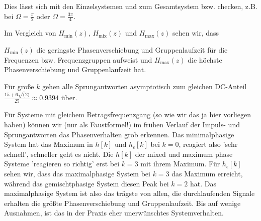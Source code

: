 \begin{Loesung}
Dies lässt sich mit den Einzelsystemen  und
 zum Gesamtsystem 
bzw.  checken, z.B. bei $\Omega=\frac{\pi}{2}$ oder
$\Omega=\frac{3\pi}{4}$.

Im Vergleich von $H_\mathrm{min}(z)$, $H_\mathrm{mix}(z)$ und $H_\mathrm{max}(z)$
sehen wir, dass

$H_\mathrm{min}(z)$ die geringste Phasenverschiebung und Gruppenlaufzeit
für die Frequenzen bzw. Frequenzgruppen aufweist und $H_\mathrm{max}(z)$
die höchste Phasenverschiebung und Gruppenlaufzeit hat.

Für große $k$ gehen alle Sprungantworten asymptotisch zum gleichen DC-Anteil
$\frac{15+6\sqrt(2)}{25} \approx 0.9394$ über.

Für Systeme mit gleichem Betragsfrequenzgang (so wie wir das ja hier vorliegen
haben) können wir (nur als Faustformel!) im frühen Verlauf der Impuls- und
Sprungantworten das Phasenverhalten grob erkennen.
Das minimalphasige System hat das Maximum in $h[k]$ und $h_\epsilon[k]$ bei $k=0$,
reagiert also 'sehr schnell', schneller geht es nicht. Die $h[k]$ der mixed und
maximum phase Systeme 'reagieren so richtig' erst bei $k=3$ mit ihrem Maximum.
%
Für $h_\epsilon[k]$ sehen wir, dass das maximalphasige System bei $k=3$ das
Maximum erreicht, während das gemischtphasige System diesen Peak bei $k=2$
hat.
%
Das maximalphasige System ist also das trägste von allen, die durchlaufenden
Signale erhalten die größte Phasenverschiebung und Gruppenlaufzeit. Bis auf
wenige Ausnahmen, ist das in der Praxis eher unerwünschtes Systemverhalten.

\end{Loesung}




